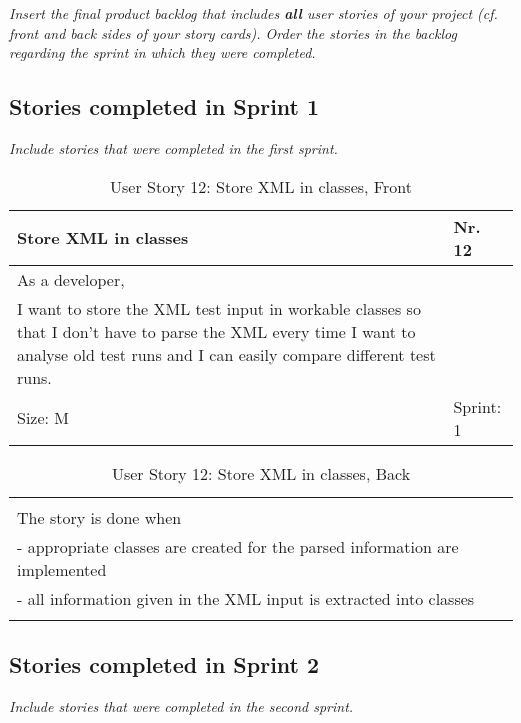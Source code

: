 \emph{Insert the final product backlog that includes \textbf{all} user stories 
of your project (cf. front and back sides of your story cards). Order the 
stories in the backlog regarding the sprint in which they were completed.}

\subsection*{Stories completed in Sprint 1}

\emph{Include stories that were completed in the first sprint.} 

\begin{table}[h]
  \caption{User Story 12: Store XML in classes, Front}
  \label{Story_12_Front}
  \centering
  \begin{tabular}{|p{9cm} p{2cm}|}
	\hline  	
  	Store XML in classes & Nr. 12 \\ 
  	\hline
  	As a developer, &    \\ 
  	I want to store the XML test input in workable classes so that I don't have to parse the XML every time I want to analyse old test runs and I can easily compare different test runs. &    \\ 
  	Size: M & Sprint: 1 \\ 
  	\hline
  \end{tabular}
\end{table}
\begin{table}[h]
  \caption{User Story 12: Store XML in classes, Back}
  \label{Story_12_Back}
  \centering
  \begin{tabular}{|p{10cm} p{1cm}|}
  \hline
  	  &    \\ 
  	The story is done when &    \\ 
  	 - appropriate classes are created for the parsed information are implemented & \\
  	 - all information given in the XML input is extracted into classes &    \\ 
  	 
  	  &  
  	   \\ 
  	\hline
  \end{tabular}
\end{table}

\subsection*{Stories completed in Sprint 2}
\emph{Include stories that were completed in the second sprint.} 

